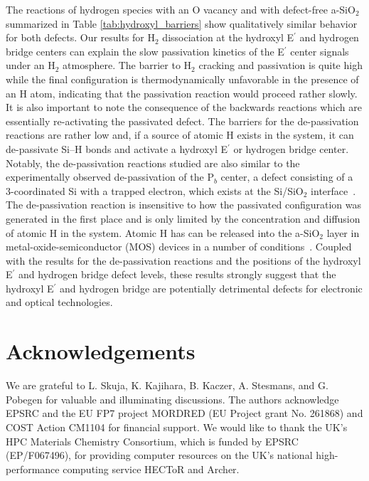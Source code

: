 \documentclass[aps,prb,reprint,superscriptaddress,showpacs]{revtex4-1}
\begin{document}
The reactions of hydrogen species with an O vacancy and with defect-free a-SiO$_2$ summarized in Table \ref{tab:hydroxyl_barriers} show qualitatively similar behavior for both defects. Our results for H$_2$ dissociation at the hydroxyl E$^\prime$ and hydrogen bridge centers can explain the slow passivation kinetics of the E$^\prime$ center signals under an H$_2$ atmosphere. The barrier to H$_2$ cracking and passivation is quite high while the final configuration is thermodynamically unfavorable in the presence of an H atom, indicating that the passivation reaction would proceed rather slowly. It is also important to note the consequence of the backwards reactions which are essentially re-activating the passivated defect. The barriers for the de-passivation reactions are rather low and, if a source of atomic H exists in the system, it can de-passivate \mbox{Si--H} bonds and activate a hydroxyl E$^\prime$ or hydrogen bridge center. Notably, the de-passivation reactions studied are also similar to the experimentally observed de-passivation of the P$_b$ center, a defect consisting of a 3-coordinated Si with a trapped electron, which exists at the Si/SiO$_2$ interface~\cite{cartier_depassivation}. The de-passivation reaction is insensitive to how the passivated configuration was generated in the first place and is only limited by the concentration and diffusion of atomic H in the system. Atomic H has can be released into the a-SiO$_2$ layer in metal-oxide-semiconductor (MOS) devices in a number of conditions~\cite{h_gate1,h_gate2,poindexter_hydrogenous}. Coupled with the results for the de-passivation reactions and the positions of the hydroxyl E$^\prime$ and hydrogen bridge defect levels, these results strongly suggest that the hydroxyl E$^\prime$ and hydrogen bridge are potentially detrimental defects for electronic and optical technologies.

\section{Acknowledgements}
We are grateful to L. Skuja, K. Kajihara, B. Kaczer, A. Stesmans, and G. Pobegen for valuable and illuminating discussions. The authors acknowledge EPSRC and the EU FP7 project MORDRED (EU Project grant No. 261868) and COST Action CM1104 for financial support. We would like to thank the UK's HPC Materials Chemistry Consortium, which is funded by EPSRC (EP/F067496), for providing computer resources on the UK's national high-performance computing service HECToR and Archer. 


\end{document}
